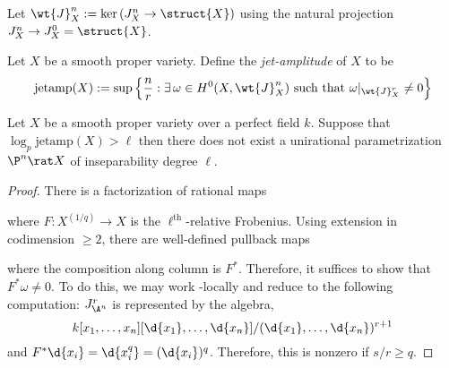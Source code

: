 \documentclass[12pt]{article}
\begin{document}
\newcommand{\jetamp}{\mathrm{jetamp}}

\begin{defn}
Let $\wt{J}^n_X := \ker{(J^n_X \to \struct{X})}$ using the natural projection $J^n_X \to J^0_X = \struct{X}$.
\end{defn}

\begin{defn}
Let $X$ be a smooth proper variety. Define the \textit{jet-amplitude} of $X$ to be
\[ \jetamp(X) := \sup \left \{ \frac{n}{r} : \exists \, \omega \in H^0(X, \wt{J}^{n}_X) \text{ such that } \omega|_{\wt{J}^{r}_X} \neq 0 \right\} \]
\end{defn}

\begin{theorem}[C]
Let $X$ be a smooth proper variety over a perfect field $k$. Suppose that $\log_p \jetamp(X) > \ell$ then there does not exist a unirational parametrization $\P^n \rat X$ of inseparability degree $\ell$.
\end{theorem}

\begin{proof}
There is a factorization of rational maps
\begin{center}
\end{center}
where $F : X^{(1/q)} \to X$ is the $\ell^{\text{th}}$-relative Frobenius. 
Using extension in codimension $\ge 2$, there are well-defined pullback maps
\begin{center}
\end{center} 
where the composition along column is $F^*$. Therefore, it suffices to show that $F^* \omega \neq 0$. To do this, we may work \etale-locally and reduce to the following computation: $J^r_{\A^n}$ is represented by the algebra,
\[ k[x_1, \dots, x_n][\d{x_1}, \dots, \d{x_n}] / (\d{x_1}, \dots, \d{x_n})^{r+1} \] and $F^* \d{x_i} = \d{x_i^{q}} = (\d{x_i})^{q}$. Therefore, this is nonzero if $s/r \ge q$.
\end{proof}
\end{document}
